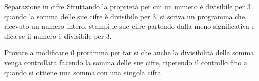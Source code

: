 \documentclass[aspectratio=169]{beamer}
\begin{document}
\begin{frame}{Separazione in cifre}
    Sfruttando la proprietà per cui un numero è divisibile per 3 quando la somma delle sue cifre è divisibile per 3, si
    scriva un programma che, ricevuto un numero intero, stampi le sue cifre partendo dalla meno significativa e dica se
    il numero è divisibile per 3.

    Provare a modificare il proramma per far si che anche la divisibilità della somma venga controllata facendo la somma
    delle sue cifre, ripetendo il controllo fino a quando si ottiene una somma con una singola cifra.
\end{frame}

%
\end{document}
